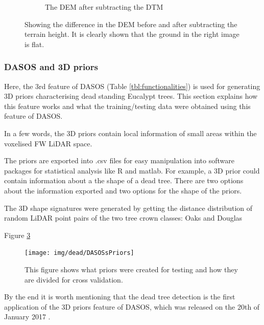 \documentclass{subfiles}
\begin{document}
\begin{figure} [h!]
\begin{subfigure}[t]{.49\textwidth}
		\caption{The DEM after subtracting the DTM} 
		\label{fig:height_dtm}
	\end{subfigure} \hfill
	\caption{Showing the difference in the DEM before and after subtracting the terrain height. It is clearly shown that the ground in the right image is flat.}  
	\label{fig:height_minus_dtm} 
\end{figure}


\subsubsection{DASOS and 3D priors}

\par Here, the 3rd feature of DASOS (Table \ref{tbl:functionalities}) is used for generating 3D priors characterising dead standing Eucalypt trees.  This section explains how this feature works and what the training/testing data were obtained using this feature of DASOS. 

\par  In a few words, the 3D priors contain local information of small areas within the voxelised FW LiDAR space. 

The priors are exported into .csv files for easy manipulation into software packages for statistical analysis like R and matlab. For example, a 3D prior could contain information about a the shape of a dead tree. There are two options about the information exported and two options for the shape of the priors.  

The 3D shape signatures were generated by getting the distance distribution of random LiDAR point pairs of the two tree crown classes: Oaks and Douglas \cite{Dong2009}







\par Figure \ref{fig:DASOSsPriors}


\begin{figure} [h!]
	\centering
	\texttt{[image: img/dead/DASOSsPriors]}
	\caption{This figure shows what priors were created for testing and how they are divided for cross validation.}
	\label{fig:DASOSsPriors}
\end{figure}



\par By the end it is worth mentioning that the dead tree detection is the first application of the 3D priors feature of DASOS, which was released on the 20th of January 2017 \cite{DASOS_v2}. 
\end{document}
